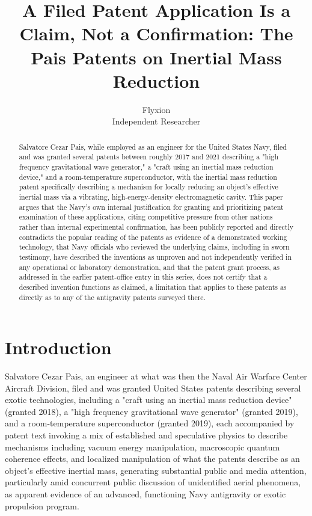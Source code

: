 \documentclass[11pt]{article}
\title{A Filed Patent Application Is a Claim, Not a Confirmation: The Pais Patents on Inertial Mass Reduction}
\author{Flyxion \\ \small Independent Researcher}
\date{}
\begin{document}
\maketitle

\begin{abstract}
Salvatore Cezar Pais, while employed as an engineer for the United States Navy, filed and was granted several patents between roughly 2017 and 2021 describing a "high frequency gravitational wave generator," a "craft using an inertial mass reduction device," and a room-temperature superconductor, with the inertial mass reduction patent specifically describing a mechanism for locally reducing an object's effective inertial mass via a vibrating, high-energy-density electromagnetic cavity. This paper argues that the Navy's own internal justification for granting and prioritizing patent examination of these applications, citing competitive pressure from other nations rather than internal experimental confirmation, has been publicly reported and directly contradicts the popular reading of the patents as evidence of a demonstrated working technology, that Navy officials who reviewed the underlying claims, including in sworn testimony, have described the inventions as unproven and not independently verified in any operational or laboratory demonstration, and that the patent grant process, as addressed in the earlier patent-office entry in this series, does not certify that a described invention functions as claimed, a limitation that applies to these patents as directly as to any of the antigravity patents surveyed there.
\end{abstract}

\section{Introduction}

Salvatore Cezar Pais, an engineer at what was then the Naval Air Warfare Center Aircraft Division, filed and was granted United States patents describing several exotic technologies, including a "craft using an inertial mass reduction device" (granted 2018), a "high frequency gravitational wave generator" (granted 2019), and a room-temperature superconductor (granted 2019), each accompanied by patent text invoking a mix of established and speculative physics to describe mechanisms including vacuum energy manipulation, macroscopic quantum coherence effects, and localized manipulation of what the patents describe as an object's effective inertial mass, generating substantial public and media attention, particularly amid concurrent public discussion of unidentified aerial phenomena, as apparent evidence of an advanced, functioning Navy antigravity or exotic propulsion program.
\end{document}
